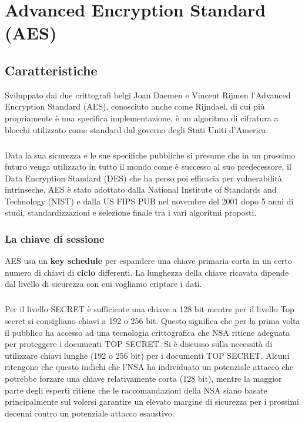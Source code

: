 \chapter{Advanced Encryption Standard (AES)}

\section{Caratteristiche}
Sviluppato dai due crittografi belgi Joan Daemen e Vincent Rijmen l'Advanced Encryption Standard (AES), conosciuto anche come Rijndael, di cui più propriamente è una specifica implementazione, è un algoritmo di cifratura a blocchi utilizzato come standard dal governo degli Stati Uniti d'America. 

\paragraph{}
Data la sua sicurezza e le sue specifiche pubbliche si presume che in un prossimo futuro venga utilizzato in tutto il mondo come è successo al suo predecessore, il Data Encryption Standard (DES) che ha perso poi efficacia per vulnerabilità intrinseche. AES è stato adottato dalla National Institute of Standards and Technology (NIST) e dalla US FIPS PUB nel novembre del 2001 dopo 5 anni di studi, standardizzazioni e selezione finale tra i vari algoritmi proposti.

\subsection{ La chiave di sessione}
AES  usa un \textbf{key schedule} per espandere una chiave primaria corta in un certo numero di chiavi di \textbf{ciclo} differenti. La lunghezza della chiave ricavata dipende dal livello di sicurezza con cui vogliamo criptare i dati.
\paragraph{}
Per il livello SECRET è sufficiente una chiave a 128 bit mentre per il livello Top secret si consigliano chiavi a 192 o 256 bit. Questo significa che per la prima volta il pubblico ha accesso ad una tecnologia crittografica che NSA ritiene adeguata per proteggere i documenti TOP SECRET. Si è discusso sulla necessità di utilizzare chiavi lunghe (192 o 256 bit) per i documenti TOP SECRET. Alcuni ritengono che questo indichi che l'NSA ha individuato un potenziale attacco che potrebbe forzare una chiave relativamente corta (128 bit), mentre la maggior parte degli esperti ritiene che le raccomandazioni della NSA siano basate principalmente sul volersi garantire un elevato margine di sicurezza per i prossimi decenni contro un potenziale attacco esaustivo.


